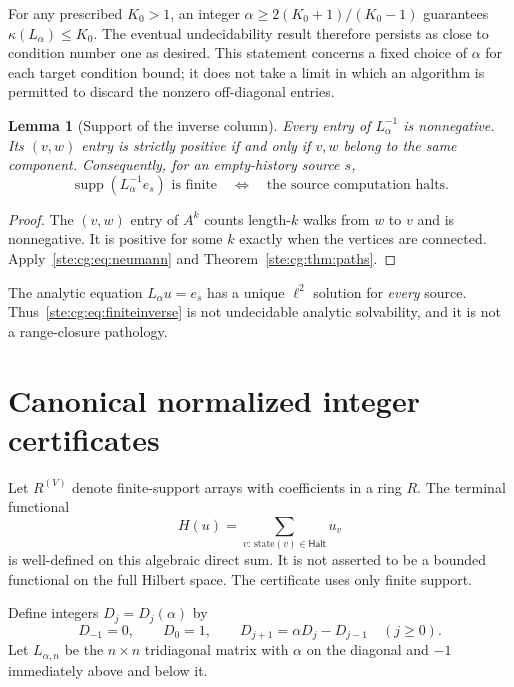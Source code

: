 \documentclass[11pt,letterpaper]{article}
\newtheorem{lemma}[theorem]{Lemma}
\theoremstyle{definition}
\theoremstyle{remark}
\DeclareMathOperator{\supp}{supp}
\newcommand{\Halt}{\mathsf{Halt}}
\begin{document}
For any prescribed $K_0>1$, an integer
$\alpha\ge 2(K_0+1)/(K_0-1)$ guarantees
$\kappa(L_\alpha)\le K_0$. The eventual undecidability result therefore
persists as close to condition number one as desired. This statement
concerns a fixed choice of $\alpha$ for each target condition bound; it
does not take a limit in which an algorithm is permitted to discard the
nonzero off-diagonal entries.

\begin{lemma}[Support of the inverse column]\label{ste:cg:lem:positive}
Every entry of $L_\alpha^{-1}$ is nonnegative. Its $(v,w)$ entry is strictly
positive if and only if $v,w$ belong to the same component. Consequently,
for an empty-history source $s$,
\begin{equation}\label{ste:cg:eq:finiteinverse}
 \supp(L_\alpha^{-1}e_s)\text{ is finite}
 \quad\Longleftrightarrow\quad
 \text{the source computation halts}.
\end{equation}
\end{lemma}
\begin{proof}
The $(v,w)$ entry of $A^k$ counts length-$k$ walks from $w$ to $v$ and is
nonnegative. It is positive for some $k$ exactly when the vertices are
connected. Apply~\eqref{ste:cg:eq:neumann} and Theorem~\ref{ste:cg:thm:paths}.
\end{proof}

The analytic equation $L_\alpha u=e_s$ has a unique $\ell^2$ solution for
\emph{every} source. Thus~\eqref{ste:cg:eq:finiteinverse} is not undecidable
analytic solvability, and it is not a range-closure pathology.

\section{Canonical normalized integer certificates}\label{ste:cg:sec:certificate}
Let $R^{(V)}$ denote finite-support arrays with coefficients in a ring $R$.
The terminal functional
\begin{equation}\label{ste:cg:eq:terminal}
 H(u)=\sum_{v:\,\text{state}(v)\in\Halt}u_v
\end{equation}
is well-defined on this algebraic direct sum. It is not asserted to be a
bounded functional on the full Hilbert space. The certificate uses only
finite support.

Define integers $D_j=D_j(\alpha)$ by
\begin{equation}\label{ste:cg:eq:continuants}
 D_{-1}=0,\qquad D_0=1,\qquad
 D_{j+1}=\alpha D_j-D_{j-1}\quad(j\ge0).
\end{equation}
Let $L_{\alpha,n}$ be the $n\times n$ tridiagonal matrix with $\alpha$ on the
diagonal and $-1$ immediately above and below it.
\end{document}
